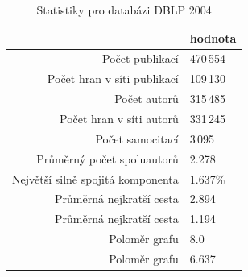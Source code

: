 \documentclass{bakalarka}
\begin{document}
\begin{table}[!ht]
\centering
\caption{Statistiky pro databázi DBLP 2004}
\label{tab:dblpstat}
\begin{tabular}{r|l}
\toprule
& hodnota \\
\midrule
Počet publikací & 470\,554 \\
Počet hran v síti publikací & 109\,130 \\
Počet autorů & 315\,485 \\
Počet hran v síti autorů & 331\,245 \\
Počet samocitací & 3\,095 \\
Průměrný počet spoluautorů & 2.278 \\
Největší silně spojitá komponenta & 1.637\% \\
Průměrná nejkratší cesta\footnotemark[1] & 2.894 \\
Průměrná nejkratší cesta\footnotemark[2] & 1.194 \\
Poloměr grafu\footnotemark[1] & 8.0 \\
Poloměr grafu\footnotemark[2] & 6.637 \\
\bottomrule
\end{tabular}
\end{table}
\end{document}
